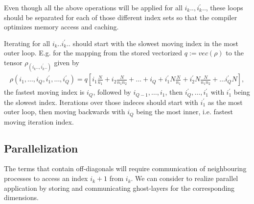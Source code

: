 \documentclass[letterpaper]{article}
\begin{document}
  Even though all the above operations will be applied for all $i_k.., i_k^\prime..$, these loops should be separated for each of those different index sets so that the compiler optimizes memory access and caching.

  Iterating for all $i_k..i_k^\prime..$ should start with the slowest moving index in the most outer loop. E.g. for the mapping from the stored vectorized $q := vec(\rho)$ to the tensor $\rho_(i_k..,i_k^\prime..)$ given by
    \begin{align}
        \rho(i_1,\dots,i_Q,i_1^\prime,\dots,i_Q^\prime) = q[i_1 \frac{N}{n_1} + i_2 \frac{N}{n_1n_2} +  \dots + i_Q + i_1^\prime N \frac{N}{n_1} + i_2^\prime N \frac{N}{n_1n_2} + \dots i_Q^\prime N],
    \end{align}
  the fastest moving index is $i_Q$, followed by $i_{Q-1}, \dots, i_1$, then $i_Q^\prime, \dots, i_1^\prime$ with $i_1^\prime$ being the slowest index. Iterations over those indeces should start with $i_1^\prime$ as the most outer loop, then moving backwards with $i_Q$ being the most inner, i.e. fastest moving iteration index.

 \subsection{Parallelization} 
 The terms that contain off-diagonals will require communication of neighbouring processes to access an index $i_k+1$ from $i_k$. We can consider to realize parallel application by storing and communicating ghost-layers for the corresponding dimensions. 
\end{document}
